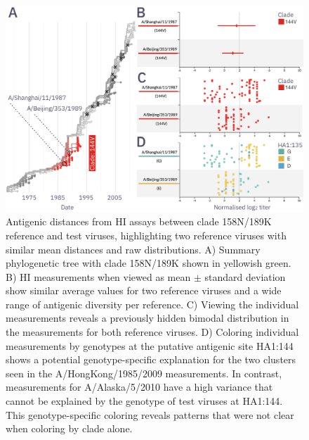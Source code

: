 \documentclass[utf8]{FrontiersinHarvard} %
\begin{document}
\begin{figure}[h!]
  \begin{center}
    \includegraphics[width=\textwidth]{figures/figure-4}
  \end{center}
  \caption{
    Antigenic distances from HI assays between clade 158N/189K reference and test viruses, highlighting two reference viruses with similar mean distances and raw distributions.
    A) Summary phylogenetic tree with clade 158N/189K shown in yellowish green.
    B) HI measurements when viewed as mean $\pm$ standard deviation show similar average values for two reference viruses and a wide range of antigenic diversity per reference.
    C) Viewing the individual measurements reveals a previously hidden bimodal distribution in the measurements for both reference viruses.
    D) Coloring individual measurements by genotypes at the putative antigenic site HA1:144 shows a potential genotype-specific explanation for the two clusters seen in the A/HongKong/1985/2009 measurements.
    In contrast, measurements for A/Alaska/5/2010 have a high variance that cannot be explained by the genotype of test viruses at HA1:144.
    This genotype-specific coloring reveals patterns that were not clear when coloring by clade alone.
  }
  \label{fig:4}
\end{figure}

\end{document}
